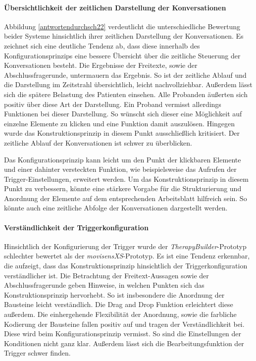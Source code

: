 \paragraph{Übersichtlichkeit der zeitlichen Darstellung der Konversationen}
Abbildung \ref{antwortendurchsch22} verdeutlicht die unterschiedliche Bewertung beider Systeme hinsichtlich ihrer zeitlichen Darstellung der Konversationen. Es zeichnet sich eine deutliche Tendenz ab, dass diese innerhalb des Konfigurationsprinzips eine bessere Übersicht über die zeitliche Steuerung der Konversationen besteht. Die Ergebnisse der Freitexte, sowie der Abschlussfragerunde, untermauern das Ergebnis. So ist der zeitliche Ablauf und die Darstellung im Zeitstrahl übersichtlich, leicht nachvollziehbar. Außerdem lässt sich die spätere Belastung des Patienten einsehen. Alle Probanden äußerten sich positiv über diese Art der Darstellung. Ein Proband vermisst allerdings Funktionen bei dieser Darstellung. So wünscht sich dieser eine Möglichkeit auf einzelne Elemente zu klicken und eine Funktion damit auszulösen. Hingegen wurde das Konstruktionsprinzip in diesem Punkt ausschließlich kritisiert. Der zeitliche Ablauf der Konversationen ist schwer zu überblicken. 

Das Konfigurationsprinzip kann leicht um den Punkt der klickbaren Elemente und einer dahinter versteckten Funktion, wie beispielsweise das Aufrufen der Trigger-Einstellungen, erweitert werden. Um das Konstruktionsprinzip in diesem Punkt zu verbessern, könnte eine stärkere Vorgabe für die Strukturierung und Anordnung der Elemente auf dem entsprechenden Arbeitsblatt hilfreich sein. So könnte auch eine zeitliche Abfolge der Konversationen dargestellt werden.


\paragraph{Verständlichkeit der Triggerkonfiguration}
Hinsichtlich der Konfigurierung der Trigger wurde der \emph{TherapyBuilder}-Prototyp schlechter bewertet als der \emph{movisensXS}-Prototyp. Es ist eine Tendenz erkennbar, die aufzeigt, dass das Konstruktionsprinzip hinsichtlich der Triggerkonfiguration verständlicher ist. Die Betrachtung der Freitext-Aussagen sowie der Abschlussfragerunde geben Hinweise, in welchen Punkten sich das Konstruktionsprinzip hervorhebt. So ist insbesondere die Anordnung der Bausteine leicht verständlich. Die Drag and Drop Funktion erleichtert diese außerdem. Die einhergehende Flexibilität der Anordnung, sowie die farbliche Kodierung der Bausteine fallen positiv auf und tragen der Verständlichkeit bei. Diese wird beim Konfigurationsprinzip vermisst. So sind die Einstellungen der Konditionen nicht ganz klar. Außerdem lässt sich die Bearbeitungsfunktion der Trigger schwer finden. 

